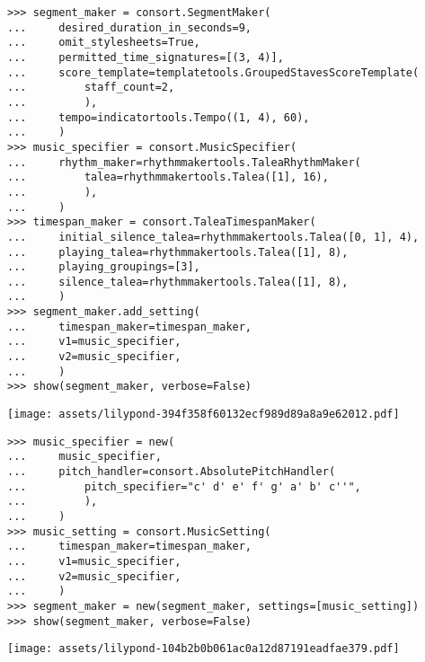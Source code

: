 \begin{singlespacing}
\vspace{-0.5\baselineskip}
\begin{lstlisting}
>>> segment_maker = consort.SegmentMaker(
...     desired_duration_in_seconds=9,
...     omit_stylesheets=True,
...     permitted_time_signatures=[(3, 4)],
...     score_template=templatetools.GroupedStavesScoreTemplate(
...         staff_count=2,
...         ),
...     tempo=indicatortools.Tempo((1, 4), 60),
...     )
>>> music_specifier = consort.MusicSpecifier(
...     rhythm_maker=rhythmmakertools.TaleaRhythmMaker(
...         talea=rhythmmakertools.Talea([1], 16),
...         ),
...     )
>>> timespan_maker = consort.TaleaTimespanMaker(
...     initial_silence_talea=rhythmmakertools.Talea([0, 1], 4),
...     playing_talea=rhythmmakertools.Talea([1], 8),
...     playing_groupings=[3],
...     silence_talea=rhythmmakertools.Talea([1], 8),
...     )
>>> segment_maker.add_setting(
...     timespan_maker=timespan_maker,
...     v1=music_specifier,
...     v2=music_specifier,
...     )
>>> show(segment_maker, verbose=False)
\end{lstlisting}
\noindent\texttt{[image: assets/lilypond-394f358f60132ecf989d89a8a9e62012.pdf]}
\end{singlespacing}

\begin{comment}
<abjad>[stylesheet=../consort.ily]
music_specifier = new(
    music_specifier,
    pitch_handler=consort.AbsolutePitchHandler(
        pitch_specifier="c' d' e' f' g' a' b' c''",
        ),
    )
music_setting = consort.MusicSetting(
    timespan_maker=timespan_maker,
    v1=music_specifier,
    v2=music_specifier,
    )
segment_maker = new(segment_maker, settings=[music_setting])
show(segment_maker, verbose=False)
</abjad>
\end{comment}

\begin{singlespacing}
\vspace{-0.5\baselineskip}
\begin{lstlisting}
>>> music_specifier = new(
...     music_specifier,
...     pitch_handler=consort.AbsolutePitchHandler(
...         pitch_specifier="c' d' e' f' g' a' b' c''",
...         ),
...     )
>>> music_setting = consort.MusicSetting(
...     timespan_maker=timespan_maker,
...     v1=music_specifier,
...     v2=music_specifier,
...     )
>>> segment_maker = new(segment_maker, settings=[music_setting])
>>> show(segment_maker, verbose=False)
\end{lstlisting}
\noindent\texttt{[image: assets/lilypond-104b2b0b061ac0a12d87191eadfae379.pdf]}
\end{singlespacing}

